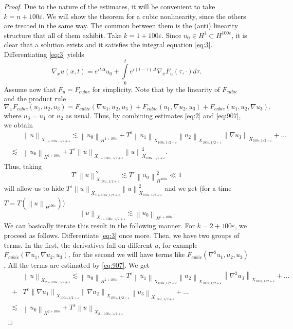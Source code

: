 \documentclass[draft,11pt,leqno]{amsart}
\newcommand{\norm}[2]{{\left\| #1 \right\|}_{#2}}
\newcommand{\De}{\Delta}
\newcommand{\ve}{\varepsilon}
\newcommand{\intl}{\int\limits}
\begin{document}
\begin{proof}
Due to the nature 
of the estimates, it will
be convenient to take $k=n+100\ve$.
We will show the theorem for a cubic nonlinearity, since the others 
are treated in the same way. The common between them is the (anti) linearity
structure that all of them exhibit. 
Take $k=1+100\ve$. Since $u_0\in H^1\subset H^{100\ve}$, it is clear that a solution 
exists and it satisfies the integral equation \eqref{eq:3}. Differentiating
 \eqref{eq:3} yields
$$
\nabla_x u(x,t)=e^{i t \De}u_0+\intl_0^t e^{i (t-\tau)\De}
\nabla_x F_u(\tau, \cdot)d\tau.
$$
Assume now that $F_u=F_{cubic}$ for simplicity.  Note that by the linearity
of $F_{cubic}$ and  the product rule
$$
\nabla_x F_{cubic}(u_1,u_2,u_3)=
F_{cubic}(\nabla u_1,u_2,u_3)+F_{cubic}( u_1,\nabla u_2,u_3)+
F_{cubic}( u_1, u_2,\nabla u_3),
$$
where $u_3=u_1$ or $u_2$ as usual.
Thus, by combining estimates \eqref{eq:2} and \eqref{eq:907}, we obtain
\begin{eqnarray*}
& &\norm{u}{X_{1+100\ve,1/2+\ve}}\lesssim 
\norm{u_0}{H^{1+100\ve}}+ 
T^\ve\norm{u_1}{X_{100\ve,1/2+\ve}}\norm{u_2}{X_{100\ve,1/2+\ve}}
\norm{\nabla u_3}{X_{100\ve,1/2+\ve}}+\ldots \\
&\lesssim& \norm{u_0}{H^{1+100\ve}}+ T^{\ve}\norm{u}{X_{1+100\ve,1/2+\ve}}
\norm{u}{X_{100\ve,1/2+\ve}}^2.
\end{eqnarray*}
Thus, taking 
$$
T^\ve \norm{u}{X_{100\ve,1/2+\ve}}^2\lesssim 
T^\ve\norm{u_0}{H^{100\ve}}^2\ll 1
$$ 
will allow us 
to hide $T^{\ve}\norm{u}{X_{1+100\ve,1/2+\ve}}
\norm{u}{X_{100\ve,1/2+\ve}}^2$ and we get (for a time 
$T=T(\norm{u}{H^{100\ve}})$)
$$
\norm{u}{X_{1+100\ve,1/2+\ve}}\lesssim 
\norm{u_0}{H^{1+100\ve}}.
$$
We can basically iterate this result in the following manner.
For $k=2+100\ve$, we proceed as follows.
Differentiate \eqref{eq:3} once more. Then, we have two groups of terms. 
In the first, the derivatives fall on different $u$, for example
$F_{cubic}(\nabla u_1, \nabla u_2, u_3)$, for the second we will have terms 
like $F_{cubic}(\nabla^2 u_1, u_2, u_3)$. All the terms  
are estimated by \eqref{eq:907}. We get
\begin{eqnarray}
\label{eq:212}
& &\norm{u}{X_{2+100\ve,1/2+\ve}}\lesssim 
\norm{u_0}{H^{2+100\ve}}+ 
T^\ve\norm{u_1}{X_{100\ve,1/2+\ve}}\norm{u_2}{X_{100\ve,1/2+\ve}}
\norm{\nabla^2 u_3}{X_{100\ve,1/2+\ve}}+\ldots \\
\nonumber
&+& T^\ve\norm{\nabla u_1}{X_{100\ve,1/2+\ve}}
\norm{\nabla u_2}{X_{100\ve,1/2+\ve}}
\norm{ u_3}{X_{100\ve,1/2+\ve}}+\ldots \\
\nonumber
&\lesssim& \norm{u_0}{H^{2+100\ve}}+ T^{\ve}\norm{u}{X_{2+100\ve,1/2+\ve}}

\end{eqnarray}
\end{proof}
\end{document}
